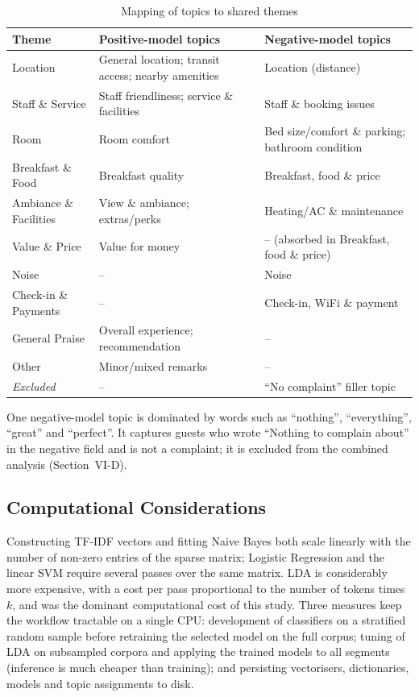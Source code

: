 \documentclass[11pt,journal,draftclsnofoot,onecolumn]{IEEEtran}
\begin{document}
\begin{table}[!t]
\caption{Mapping of topics to shared themes}
\label{tab:themes}
\centering
\small
\begin{tabular}{p{2.6cm}p{5.4cm}p{5.4cm}}
\toprule
Theme & Positive-model topics & Negative-model topics \\
\midrule
Location & General location; transit access; nearby amenities & Location (distance) \\
Staff \& Service & Staff friendliness; service \& facilities & Staff \& booking issues \\
Room & Room comfort & Bed size/comfort \& parking; bathroom condition \\
Breakfast \& Food & Breakfast quality & Breakfast, food \& price \\
Ambiance \& Facilities & View \& ambiance; extras/perks & Heating/AC \& maintenance \\
Value \& Price & Value for money & -- (absorbed in Breakfast, food \& price) \\
Noise & -- & Noise \\
Check-in \& Payments & -- & Check-in, WiFi \& payment \\
General Praise & Overall experience; recommendation & -- \\
Other & Minor/mixed remarks & -- \\
\emph{Excluded} & -- & ``No complaint'' filler topic \\
\bottomrule
\end{tabular}
\end{table}

One negative-model topic is dominated by words such as ``nothing'', ``everything'', ``great'' and ``perfect''. It captures guests who wrote ``Nothing to complain about'' in the negative field and is not a complaint; it is excluded from the combined analysis (Section~VI-D).

\subsection{Computational Considerations}
Constructing TF-IDF vectors and fitting Naive Bayes both scale linearly with the number of non-zero entries of the sparse matrix; Logistic Regression and the linear SVM require several passes over the same matrix. LDA is considerably more expensive, with a cost per pass proportional to the number of tokens times $k$, and was the dominant computational cost of this study. Three measures keep the workflow tractable on a single CPU: development of classifiers on a stratified random sample before retraining the selected model on the full corpus; tuning of LDA on subsampled corpora and applying the trained models to all segments (inference is much cheaper than training); and persisting vectorisers, dictionaries, models and topic assignments to disk.
\end{document}
